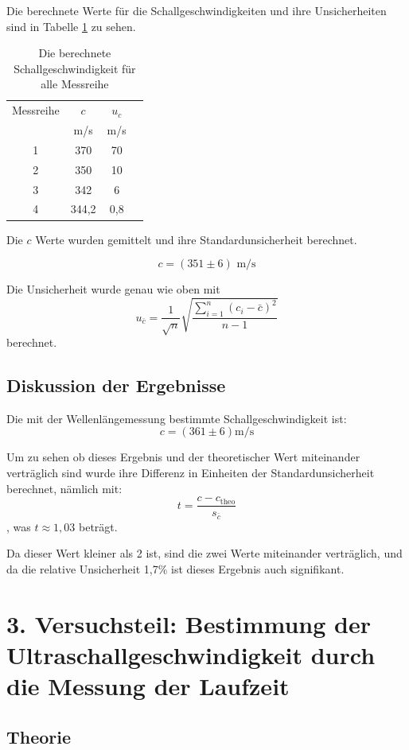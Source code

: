 \documentclass[11pt,a4paper]{article}
\begin{document}
Die berechnete Werte für die Schallgeschwindigkeiten und ihre Unsicherheiten sind in Tabelle \ref{Table2} zu sehen.

\begin{table}[h]
	\centering
	\begin{tabular*}{0.50\textwidth}{@{\extracolsep{\fill}}cccc}
		\toprule
		Messreihe & $c$ & $u_c$ \\
		& m/s&m/s\\
		1 & 370 & 70 \\
		2 & 350 & 10 \\
		3 & 342 & 6 \\
		4 & 344,2 & 0,8 \\
		\bottomrule
	\end{tabular*}
	\caption{Die berechnete Schallgeschwindigkeit für alle Messreihe}
\label{Table2}
\end{table}

Die $c$ Werte wurden gemittelt und ihre Standardunsicherheit berechnet. 

$$ c = (351 \pm 6) \textrm{ m/s}$$

Die Unsicherheit wurde genau wie oben mit
$$u_{\bar{c}} = \frac{1}{\sqrt{n}} \sqrt{\frac{\sum_{i=1}^{n}(c_i-\bar{c})^2}{n-1}}$$
berechnet. 




\subsection{Diskussion der Ergebnisse}


Die mit der Wellenlängemessung bestimmte Schallgeschwindigkeit ist:
$$ c = (361 \pm 6) \textrm{m/s} $$

Um zu sehen ob dieses Ergebnis und der theoretischer Wert miteinander verträglich sind wurde ihre Differenz in Einheiten der Standardunsicherheit berechnet, nämlich mit:
$$ t = \frac{c - c_\textrm{theo}}{s_{\bar{c}}} $$
, was $t \approx 1,03 $ beträgt. 
	
Da dieser Wert kleiner als 2 ist, sind die zwei Werte miteinander verträglich, und da die relative Unsicherheit 1,7\% ist dieses Ergebnis auch signifikant. 


\section{3. Versuchsteil: Bestimmung der Ultraschallgeschwindigkeit durch die Messung der Laufzeit}

\subsection{Theorie}
\end{document}
